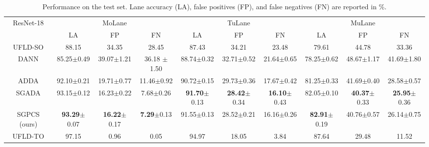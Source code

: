 \documentclass{article}
\begin{document}
	\begin{table}
		\caption{Performance on the test set. Lane accuracy (LA), false positives (FP), and false negatives (FN) are reported in \%.}
		\label{table:Results}
		\tiny
		\centering
		\setlength{\tabcolsep}{4.6pt}
		\begin{tabular}{c|ccc|ccc|ccc}
			\toprule
			\multirow{2}{*}{ResNet-18} & \multicolumn{3}{c|}{MoLane}       & \multicolumn{3}{c|}{TuLane}                       & \multicolumn{3}{c}{MuLane} \\
			& LA           & FP & FN         & LA            & FP    &  FN                      & LA       & FP    &  FN   \\
			\midrule
			UFLD-SO                   & 88.15          & 34.35  &  28.45        & 87.43           & 34.21 & 23.48                    & 79.61      & 44.78 & 33.36 \\
			DANN \cite{Ganin2016}     & 85.25$\pm$0.49 & 39.07$\pm$1.21  & 36.18 $\pm$1.50 & 88.74$\pm$0.32 & 32.71$\pm$0.52  & 21.64$\pm$0.65  & 78.25$\pm$0.62 & 48.67$\pm$1.17 & 41.69$\pm$1.80  \\
			ADDA \cite{Tzeng2017ADDA} & 92.10$\pm$0.21 & 19.71$\pm$0.77  & 11.46$\pm$0.92 & 90.72$\pm$0.15 & 29.73$\pm$0.36  & 17.67$\pm$0.42  & 81.25$\pm$0.33 & 41.69$\pm$0.40 & 28.58$\pm$0.57   \\
			SGADA \cite{sgada2021}    & 93.15$\pm$0.12 & 16.23$\pm$0.22 & 7.68$\pm$0.26 & \textbf{91.70}$\pm$0.13 & \textbf{28.42}$\pm$0.34 & \textbf{16.10}$\pm$0.43 & 82.05$\pm$0.10 & \textbf{40.37}$\pm$0.33 & \textbf{25.95}$\pm$0.36\\
			SGPCS (ours)                & \textbf{93.29}$\pm$0.07 & \textbf{16.22}$\pm$0.17 & \textbf{7.29}$\pm$0.13  & 91.55$\pm$0.13 & 28.52$\pm$0.21 & 16.16$\pm$0.26 & \textbf{82.91}$\pm$0.19 & 40.76$\pm$0.57 & 26.14$\pm$0.75\\
			\midrule
			UFLD-TO                   & 97.15           & 0.96  &    0.05       &  94.97          & 18.05           & 3.84          & 87.64  & 29.48 & 11.52 \\ 
			
			\midrule
			\midrule
			

\end{tabular}
\end{table}
\end{document}
